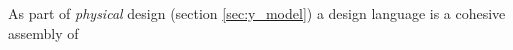 \begin{definition} \label{def:design_language} 
  As part of \emph{physical} design (section \ref{sec:y_model}) a design language is a cohesive assembly of  \todo  \cite[p. 203-204]{benyon14}
\end{definition}
